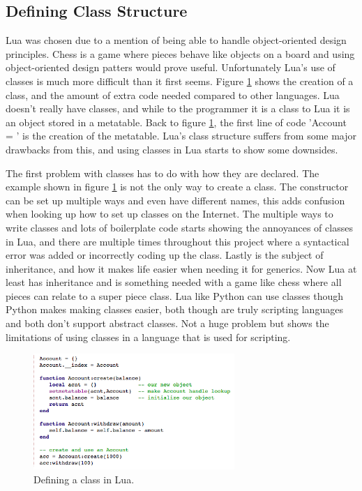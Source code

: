 \documentclass[12pt]{article}
\begin{document}
\subsection{Defining Class Structure}
Lua was chosen due to a mention of being able to handle object-oriented design principles.  Chess is a game where pieces behave like objects on a board and using object-oriented design patters would prove useful.  Unfortunately Lua's use of classes is much more difficult than it first seems.  Figure \ref{fig:LuaClass} shows the creation of a class, and the amount of extra code needed compared to other languages.  Lua doesn't really have classes, and while to the programmer it is a class to Lua it is an object stored in a metatable.  Back to figure \ref{fig:LuaClass}, the first line of code 'Account = {}' is the creation of the metatable.  Lua's class structure suffers from some major drawbacks from this, and using classes in Lua starts to show some downsides.

The first problem with classes has to do with how they are declared.  The example shown in figure \ref{fig:LuaClass} is not the only way to create a class.  The constructor can be set up multiple ways and even have different names, this adds confusion when looking up how to set up classes on the Internet.  The multiple ways to write classes and lots of boilerplate code starts showing the annoyances of classes in Lua, and there are multiple times throughout this project where a syntactical error was added or incorrectly coding up the class.  Lastly is the subject of inheritance, and how it makes life easier when needing it for generics.  Now Lua at least has inheritance and is something needed with a game like chess where all pieces can relate to a super piece class.  Lua like Python can use classes though Python makes making classes easier, both though are truly scripting languages and both don't support abstract classes.  Not a huge problem but shows the limitations of using classes in a language that is used for scripting.

\begin{figure}
\begin{center}
\includegraphics[width=3in]{LuaClass.png}
\end{center}
\caption{\label{fig:LuaClass} Defining a class in Lua.}
\end{figure}
\end{document}
